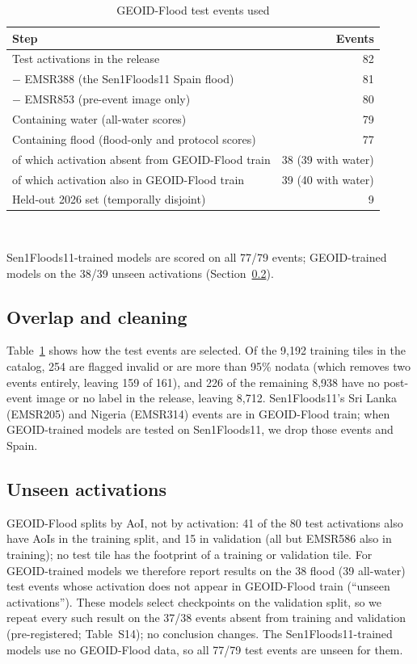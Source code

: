 \begin{table}[t]
\caption{GEOID-Flood test events used}
\label{tab:events}
\centering
\footnotesize
\begin{tabular}{@{}lr@{}}
\toprule
Step & Events \\
\midrule
Test activations in the release & 82 \\
\quad $-$ EMSR388 (the Sen1Floods11 Spain flood) & 81 \\
\quad $-$ EMSR853 (pre-event image only) & 80 \\
Containing water (all-water scores) & 79 \\
Containing flood (flood-only and protocol scores) & 77 \\
\quad of which activation absent from GEOID-Flood train & 38 (39 with water) \\
\quad of which activation also in GEOID-Flood train & 39 (40 with water) \\
Held-out 2026 set (temporally disjoint) & 9 \\
\bottomrule
\end{tabular}
\\[2pt]\raggedright\footnotesize Sen1Floods11-trained models are scored on all 77/79 events; GEOID-trained
models on the 38/39 unseen activations (Section~\ref{sec:unseen}).
\end{table}

\subsection{Overlap and cleaning}
Table~\ref{tab:events} shows how the test events are selected. Of the 9,192 training tiles in the catalog, 254 are flagged invalid or are more than 95\%
nodata (which removes two events entirely, leaving 159 of 161), and 226 of the remaining 8,938 have no
post-event image or no label in the release, leaving 8,712. Sen1Floods11's Sri Lanka (EMSR205) and
Nigeria (EMSR314) events are in GEOID-Flood train; when GEOID-trained models are tested on Sen1Floods11,
we drop those events and Spain.

\subsection{Unseen activations}
\label{sec:unseen}
GEOID-Flood splits by AoI, not by activation: 41 of the 80 test activations also have AoIs in the
training split, and 15 in validation (all but EMSR586 also in training); no test tile has the footprint of
a training or validation tile. For GEOID-trained models we therefore report results on the 38 flood (39
all-water) test events whose activation does not appear in GEOID-Flood train (``unseen activations'').
These models select checkpoints on the validation split, so we repeat every such result on the 37/38 events
absent from training and validation (pre-registered; Table~S14); no conclusion changes. The Sen1Floods11-trained models use no
GEOID-Flood data, so all 77/79 test events are unseen for them.
